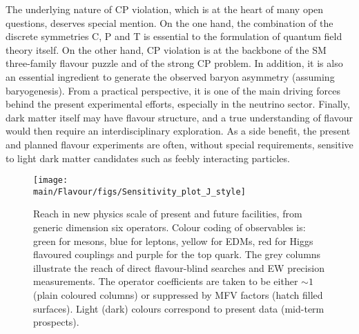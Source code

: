 \documentclass[../report.tex]{subfiles}
\providecommand{\main}{..}
\begin{document}
    
     The underlying nature of CP violation, which is at the heart of many open questions,
     deserves  
     special mention. On the one hand, the  combination of the discrete symmetries C, P and T is essential to the formulation of quantum field theory itself. On the other hand, CP violation  is at the backbone of the SM three-family flavour puzzle and of the strong CP problem. In addition,  it 
     is also an essential ingredient to generate the observed baryon asymmetry (assuming baryogenesis). From a 
     practical perspective, it is one of the main driving forces behind the present experimental efforts, especially in the neutrino sector. Finally,  dark matter itself may have flavour structure,   and 
     a true understanding of flavour would then require an interdisciplinary exploration. As a side benefit,  
      the present and planned flavour experiments  are  often, without special requirements, 
      sensitive to light dark matter candidates such as feebly interacting particles.
 
\begin{figure}
\begin{center}
\texttt{[image: \\main/Flavour/figs/Sensitivity\_plot\_J\_style]}
\end{center}
\caption{Reach in new physics scale of present and future facilities, from generic dimension six operators. Colour coding of observables is: green for mesons, blue for leptons, yellow for EDMs, red for Higgs flavoured couplings and purple for the top quark. The grey columns illustrate the reach of direct flavour-blind searches and EW precision measurements.
The operator coefficients are taken to be either $\sim 1$ (plain coloured columns)
or suppressed by MFV factors (hatch filled surfaces). Light (dark) colours correspond to present data (mid-term prospects).
}\label{fig:NPscales}
\end{figure}
  
\end{document}
